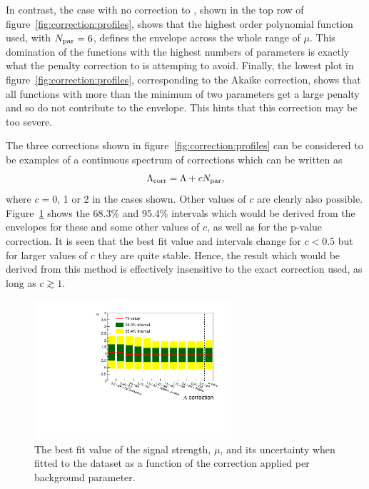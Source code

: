 In contrast, the case with no correction to \nll, shown in the top row of 
figure~\ref{fig:correction:profiles}, shows that the highest order polynomial
function used, with $N_{\rm par}=6$, defines the envelope across the whole 
range of $\mu$. This domination of the functions with the highest numbers of
parameters is exactly what the penalty correction to \nll is attemping to
avoid. Finally, the lowest plot in figure~\ref{fig:correction:profiles},
corresponding to the Akaike correction, shows that all functions with more
than the minimum of two parameters get a large penalty and so do not
contribute to the envelope. This hints that this correction may be too severe.

The three corrections shown in figure~\ref{fig:correction:profiles} can be
considered to be examples of a continuous spectrum of corrections which can
be written as
\begin{displaymath}
\Lambda_{\mathrm{corr}} = \textrm{\ensuremath{\Lambda}} + cN_{\rm par},
\end{displaymath}
where $c=0$, 1 or 2 in the cases shown. Other values of $c$ are clearly
also possible.
Figure~\ref{fig:correction:correction} shows the
68.3\% and 95.4\% intervals which would be derived from the envelopes
for these and
some other values of $c$, as well as for the p-value correction.
It is seen that the best fit value and intervals change for $c<0.5$ but
for larger values of $c$ they are quite stable. Hence, the result which would
be derived from this method is effectively insensitive to the exact correction
used, as long as $c \gtrsim 1$.
%
\begin{figure}[htp]
\centering
\includegraphics[width=0.65\textwidth]{correction/correction.pdf}
\caption{The best fit value of the signal strength, $\mu$, and its uncertainty when fitted to the dataset as a function of the correction applied per background parameter.}
\label{fig:correction:correction}
\end{figure}


